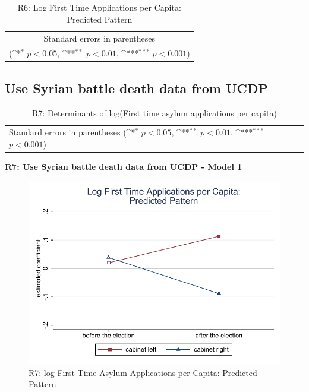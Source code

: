 \documentclass[10pt,a4paper]{scrartcl}
\begin{document}
\begin{table}[!ht]\centering
	\footnotesize
	\renewcommand{\arraystretch}{1.2}
	\def\sym#1{\ifmmode^{#1}\else\(^{#1}\)\fi}
	\caption{R6: Log First Time Applications per Capita: Predicted Pattern}
	\begin{tabular}{l*{2}{c}}
		\hline\hline
		
		\hline\hline
		\multicolumn{3}{c}{\footnotesize Standard errors in parentheses} \\
		\multicolumn{3}{c}{\footnotesize (\sym{*} \(p<0.05\), \sym{**} \(p<0.01\), \sym{***} \(p<0.001\))} \\
	\end{tabular}
\end{table}




\clearpage
\FloatBarrier
\subsection{Use Syrian battle death data from UCDP}
\begin{table}[!ht]\centering
	\renewcommand{\arraystretch}{1.25}
	\small
	\def\sym#1{\ifmmode^{#1}\else\(^{#1}\)\fi}
	\caption{R7: Determinants of log(First time asylum applications per capita)}
	\begin{tabular}{l*{3}{c}}
		\hline\hline
		
		\hline\hline
		\multicolumn{4}{l}{\footnotesize Standard errors in parentheses (\sym{*} \(p<0.05\), \sym{**} \(p<0.01\), \sym{***} \(p<0.001\))}\\
	\end{tabular}
\end{table}

\clearpage
\textbf{R7: Use Syrian battle death data from UCDP - Model 1}
\begin{figure}[!ht]
	\centering
	\includegraphics[width=1\textwidth]{figures_edited/app_graph1_R7.pdf}
	\caption{R7: log First Time Asylum Applications per Capita: Predicted Pattern}
\end{figure}
\end{document}
